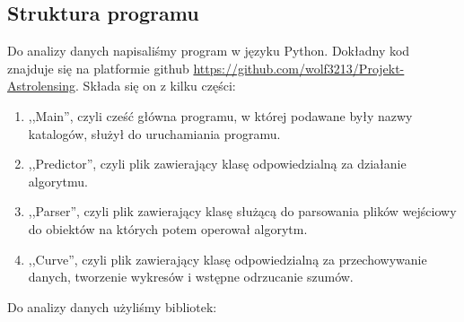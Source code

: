 \documentclass[a4paper,11pt]{article}
\newcommand{\ak}{\hspace{0.7 cm}}
\begin{document}
\subsection{Struktura programu}
\ak Do analizy danych napisaliśmy program w języku Python. Dokładny kod znajduje się na platformie github \url{https://github.com/wolf3213/Projekt-Astrolensing}. Składa się on z kilku części:
\begin{enumerate}
\item ,,Main'', czyli cześć główna programu, w której podawane były nazwy katalogów, służył do uruchamiania programu.
\item ,,Predictor'', czyli plik zawierający klasę odpowiedzialną za działanie algorytmu.
\item ,,Parser'', czyli plik zawierający klasę służącą do parsowania plików wejściowy do obiektów na których potem operował algorytm.
\item ,,Curve'', czyli plik zawierający klasę odpowiedzialną za przechowywanie danych, tworzenie wykresów i wstępne odrzucanie szumów.
\end{enumerate} 
Do analizy danych użyliśmy bibliotek:
\end{document}
